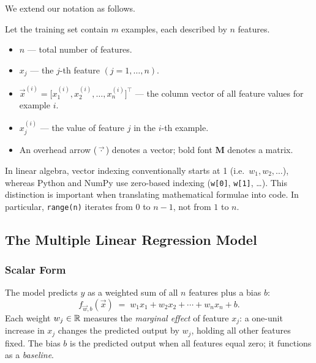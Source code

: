 We extend our notation as follows.

\begin{definition}
Let the training set contain $m$ examples, each described by $n$ features.
\begin{itemize}
\item $n$ --- total number of features.
\item $x_j$ --- the $j$-th feature $(j=1,\ldots,n)$.
\item $\vec{x}^{(i)}=\bigl[x_1^{(i)},x_2^{(i)},\ldots,x_n^{(i)}\bigr]^{\!\top}$
  --- the column vector of all feature values for example $i$.
\item $x_j^{(i)}$ --- the value of feature $j$ in the $i$-th example.
\item An overhead arrow ($\vec{\,\cdot\,}$) denotes a vector; bold font
  $\mathbf{M}$ denotes a matrix.
\end{itemize}
\end{definition}

\begin{remark}
In linear algebra, vector indexing conventionally starts at 1
(i.e.\ $w_1,w_2,\ldots$), whereas Python and NumPy use zero-based indexing
(\texttt{w[0]}, \texttt{w[1]}, \ldots). This distinction is important when
translating mathematical formulae into code. In particular,
\texttt{range(n)} iterates from $0$ to $n-1$, not from $1$ to $n$.
\end{remark}

\subsection{The Multiple Linear Regression Model}

\subsubsection{Scalar Form}

The model predicts $y$ as a weighted sum of all $n$ features plus a bias $b$:
\begin{equation}
f_{\vec{w},b}(\vec{x})
\;=\; w_1 x_1 + w_2 x_2 + \cdots + w_n x_n + b.
\label{eq:mlr-scalar}
\end{equation}
Each weight $w_j\in\mathbb{R}$ measures the \emph{marginal effect} of feature $x_j$:
a one-unit increase in $x_j$ changes the predicted output by $w_j$, holding
all other features fixed. The bias $b$ is the predicted output when all
features equal zero; it functions as a \emph{baseline}.

